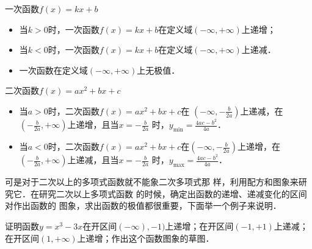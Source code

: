 一次函数$f(x)=kx+b$
\begin{itemize}
    \item 当$k>0$时，一次函数$f(x)=kx+b$在定义域$(-\infty,+\infty)$上递增；
\item 当$k<0$时，一次函数$f(x)=kx+b$在定义域$(-\infty,+\infty)$上递减．
\item 一次函数在定义域$(-\infty,+\infty)$上无极值．
\end{itemize}

二次函数$f(x)=ax^2+bx+c$
\begin{itemize}
    \item 当$a>0$时，二次函数$f(x)=ax^2+bx+c$在
$\left(-\infty,-\frac{b}{2a}\right)$上递减，在$\left(-\frac{b}{2a},+\infty\right)$上递增，且当$x=-\frac{b}{2a}$
时，$y_{\min}=\frac{4ac-b^2}{4a}$．
\item 当$a<0$时，二次函数$f(x)=ax^2+bx+c$在$\left(-\infty,-\frac{b}{2a}\right)$上递增，在$\left(-\frac{b}{2a},+\infty\right)$上递减，且当$x=-\frac{b}{2a}$
时，$y_{\max}=\frac{4ac-b^2}{4a}$．
\end{itemize}


可是对于二次以上的多项式函数就不能象二次多项式那
样，利用配方和图象来研究它．在研究二次以上多项式函数
的时候，确定出函数的递增、递减变化的区间对作出函数的
图象，求出函数的极值都很重要，下面举一个例子来说明．

\begin{example}
证明函数$y=x^3-3x$在开区间$(-\infty),-1)$上递增；在开区间$(-1,+1)$上递减；
在开区间$(1,+\infty)$上递增；作出这个函数图象的草图．
\end{example}


